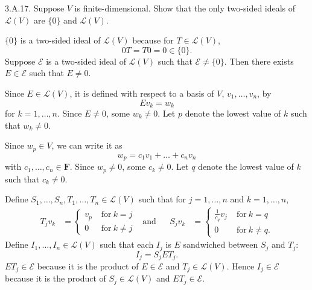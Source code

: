 \documentclass[a5paper]{article}
\begin{document}
\newcommand   \C           {\mathbf{C}}
\newcommand   \R           {\mathbf{R}}
\renewcommand \L           {\mathcal{L}}
\newcommand   \F           {\mathbf{F}}
\renewcommand \P           {\mathcal{P}}
\newcommand   \M           {\mathcal{M}}
\newcommand   \op          {\operatorname}
\newcommand \E             {\mathcal{E}}

    3.A.17.
    Suppose $V$ is finite-dimensional.
    Show that the only two-sided ideals of $\L(V)$ are $\{0\}$ and $\L(V)$.

    $\{0\}$ is a two-sided ideal of $\L(V)$ because for $T \in \L(V)$,
\begin{equation*}
        0T = T0 = 0 \in \{0\} .
\end{equation*}
    Suppose $\E$ is a two-sided ideal of $\L(V)$ such that $\E \neq \{0\}$.
    Then there exists $E \in \E$ such that $E \neq 0$.

    Since $E \in \L(V)$, it is defined with respect to a basis of $V$, $v_1,\dots,v_n$, by
\begin{equation*}
        Ev_k = w_k
\end{equation*}
    for $k = 1,\dots,n$.
    Since $E \neq 0$, some $w_k \neq 0$.
    Let $p$ denote the lowest value of $k$ such that $w_k \neq 0$.

    Since $w_p \in V$, we can write it as
\begin{equation*}
        w_p = c_1v_1 + \dots + c_nv_n
\end{equation*}
    with $c_1,\dots,c_n \in \F$.
    Since $w_p \neq 0$, some $c_k \neq 0$.
    Let $q$ denote the lowest value of $k$ such that $c_k \neq 0$.

    Define $S_1,\dots,S_n,T_1,\dots,T_n \in \L(V)$ such that for $j=1,\dots,n$ and $k=1,\dots,n$,
\begin{align*}
        T_jv_k &=
            \begin{cases}
                v_p               \; &\text{for}\ k =    j\\
                0                 \; &\text{for}\ k \neq j
            \end{cases} &\text{and}& &
        S_jv_k &=
            \begin{cases}
                \frac{1}{c_q} v_j \; &\text{for}\ k =    q\\
                0                 \; &\text{for}\ k \neq q .
            \end{cases}
\end{align*}
    Define $I_1,\dots,I_n \in \L(V)$ such that each $I_j$ is $E$ sandwiched between $S_j$ and $T_j$:
\begin{equation*}
        I_j = S_jET_j .
\end{equation*}
    $ET_j \in \E$ because it is the product of $E \in \E$ and $T_j \in \L(V)$.
    Hence $I_j \in \E$ because it is the product of $S_j \in \L(V)$ and $ET_j \in \E$.
\end{document}
